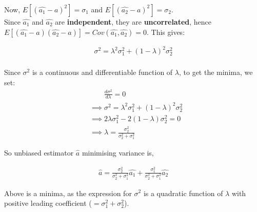 \noindent Now, $E[(\hat{a_1} - a)^2] = \sigma_1$ and $E[(\hat{a_2} - a)^2] = \sigma_2$. \\ 
Since $\hat{a_1}$ and  $\hat{a_2}$ are \textbf{independent}, they are \textbf{uncorrelated}, hence $E[(\hat{a_1} - a)  (\hat{a_2} - a)] = Cov(\hat{a_1} , \hat{a_2}) = 0$. This gives:


\begin{align*}
\sigma^2 =  \lambda^2 \sigma_1^2 + (1 - \lambda)^2 \sigma_2^2 \\ 
\end{align*}

Since $\sigma^2$ is a continuous and differentiable function of $\lambda$, to get the minima, we 
set:
\begin{align*}
&\ \ \ \ \ \ \ \ \ \frac{d \sigma^2}{d \lambda} = 0 \\ 
&\implies \sigma^2 =  \lambda^2 \sigma_1^2 + (1 - \lambda)^2 \sigma_2^2 \\
&\implies 2 \lambda \sigma_1^2 - 2 (1 - \lambda) \sigma_2^2 = 0 \\ 
&\implies \lambda = \frac{\sigma_2^2}{\sigma_2^2 + \sigma_1^2}
\end{align*}

So unbiased estimator $\hat{a}$ minimising variance is, 

\begin{align*}
\boxed{
\hat{a} =  \frac{\sigma_2^2}{\sigma_2^2 + \sigma_1^2} 
\hat{a_1} +   \frac{\sigma_1^2}{\sigma_2^2 + \sigma_1^2} 
\hat{a_2} 
}
\end{align*}

\noindent   Above is a minima, as the expression for $\sigma^2$ is a quadratic function of $\lambda$ with positive leading coefficient ($= \sigma_1^2 + \sigma_2^2 $).

